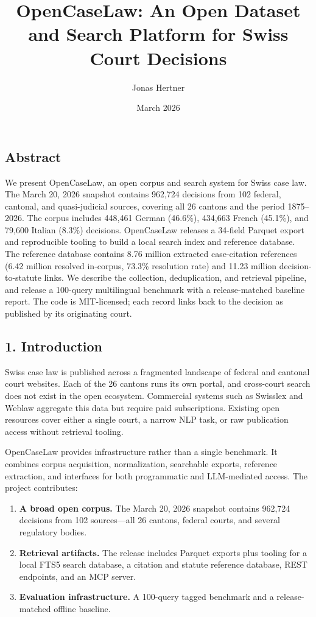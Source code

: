 \documentclass[
  11pt,
]{article}
\title{OpenCaseLaw: An Open Dataset and Search Platform for Swiss Court
Decisions}
\author{Jonas Hertner}
\date{March 2026}
\providecommand{\tightlist}{%
  \setlength{\itemsep}{0pt}\setlength{\parskip}{0pt}}
\begin{document}
\maketitle

\subsection{Abstract}\label{abstract}

We present OpenCaseLaw, an open corpus and search system for Swiss case
law. The March 20, 2026 snapshot contains 962,724 decisions from 102
federal, cantonal, and quasi-judicial sources, covering all 26 cantons
and the period 1875--2026. The corpus includes 448,461 German (46.6\%),
434,663 French (45.1\%), and 79,600 Italian (8.3\%) decisions.
OpenCaseLaw releases a 34-field Parquet export and reproducible tooling
to build a local search index and reference database. The reference
database contains 8.76 million extracted case-citation references (6.42
million resolved in-corpus, 73.3\% resolution rate) and 11.23 million
decision-to-statute links. We describe the collection, deduplication,
and retrieval pipeline, and release a 100-query multilingual benchmark
with a release-matched baseline report. The code is MIT-licensed; each
record links back to the decision as published by its originating court.

\subsection{1. Introduction}\label{introduction}

Swiss case law is published across a fragmented landscape of federal and
cantonal court websites. Each of the 26 cantons runs its own portal, and
cross-court search does not exist in the open ecosystem. Commercial
systems such as Swisslex and Weblaw aggregate this data but require paid
subscriptions. Existing open resources cover either a single court, a
narrow NLP task, or raw publication access without retrieval tooling.

OpenCaseLaw provides infrastructure rather than a single benchmark. It
combines corpus acquisition, normalization, searchable exports,
reference extraction, and interfaces for both programmatic and
LLM-mediated access. The project contributes:

\begin{enumerate}
\def\labelenumi{\arabic{enumi}.}
\tightlist
\item
  \textbf{A broad open corpus.} The March 20, 2026 snapshot contains
  962,724 decisions from 102 sources---all 26 cantons, federal courts,
  and several regulatory bodies.
\item
  \textbf{Retrieval artifacts.} The release includes Parquet exports
  plus tooling for a local FTS5 search database, a citation and statute
  reference database, REST endpoints, and an MCP server.
\item
  \textbf{Evaluation infrastructure.} A 100-query tagged benchmark and a
  release-matched offline baseline.
\end{enumerate}
\end{document}
